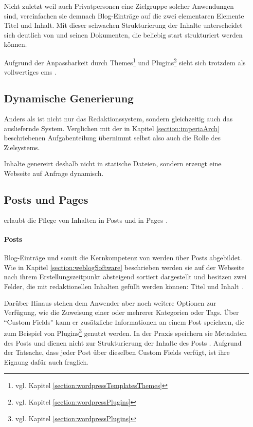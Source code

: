         Nicht zuletzt weil auch Privatpersonen eine Zielgruppe
        solcher Anwendungen sind, vereinfachen sie demnach Blog-Einträge
        auf die zwei elementaren Elemente Titel und Inhalt.
        Mit dieser schwachen Strukturierung der Inhalte
        unterscheidet sich {\wordpress} deutlich von {\imperia}
        und seinen Dokumenten, die beliebig start strukturiert
        werden können.

        Aufgrund der Anpassbarkeit durch Themes\footnote{vgl. Kapitel \ref{section:wordpressTemplatesThemes}}
        und Plugins\footnote{vgl. Kapitel \ref{section:wordpressPlugins}} sieht sich
        {\wordpress} trotzdem als vollwertiges \gls{cms}
        \cite{wordpress:About}.

    \subsection{Dynamische Generierung}
        Anders als {\imperia} ist {\wordpress} nicht nur das Redaktionssystem,
        sondern gleichzeitig auch das ausliefernde System.
        Verglichen mit der in Kapitel \ref{section:imperiaArch}
        beschriebenen Aufgabenteilung übernimmt {\wordpress} selbst
        also auch die Rolle des Zielsystems.

        Inhalte genereirt {\wordpress} deshalb nicht in statische Dateien,
        sondern erzeugt eine Webseite auf Anfrage dynamisch.

    \subsection{Posts und Pages}
        \label{section:wordpressPostsPages}
        {\wordpress} erlaubt die Pflege von Inhalten in Posts
        und in Pages \cite{wordpress:Pages}.

        \paragraph*{Posts}
        Blog-Einträge und somit die Kernkompetenz von
        {\wordpress} werden über Posts abgebildet.
        Wie in Kapitel \ref{section:weblogSoftware} beschrieben werden sie
        auf der Webseite nach ihrem Erstellungszeitpunkt absteigend sortiert dargestellt
        und besitzen zwei Felder, die mit redaktionellen Inhalten gefüllt werden können:
        Titel und Inhalt \cite{wordpress:Posts}.
        
        Darüber Hinaus stehen dem Anwender aber noch weitere Optionen zur
        Verfügung, wie die Zuweisung einer oder mehrerer Kategorien oder Tags.
        Über "`Custom Fields"' kann er zusätzliche Informationen an einem Post
        speichern, die zum Beispiel von Plugins\footnote{vgl. Kapitel \ref{section:wordpressPlugins}}
        genutzt werden.
        In der Praxis speichern sie Metadaten des Posts und dienen nicht zur Strukturierung
        der Inhalte des Posts \cite{wordpress:Posts}.
        Aufgrund der Tatsache, dass jeder Post über dieselben Custom Fields verfügt,
        ist ihre Eignung dafür auch fraglich.


